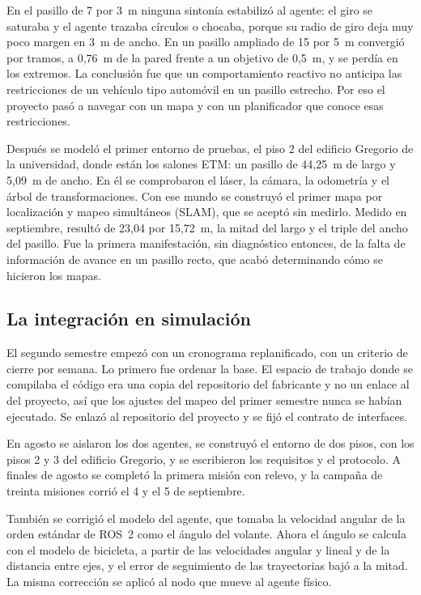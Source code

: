En el pasillo de 7 por 3~m ninguna sintonía estabilizó al agente: el giro se
saturaba y el agente trazaba círculos o chocaba, porque su radio de giro deja
muy poco margen en 3~m de ancho. En un pasillo ampliado de 15 por 5~m convergió
por tramos, a 0,76~m de la pared frente a un objetivo de 0,5~m, y se perdía
en los extremos. La conclusión fue que un comportamiento reactivo no anticipa las restricciones de un vehículo tipo automóvil en un pasillo estrecho.
Por eso el proyecto pasó a navegar con un mapa y con un planificador que conoce
esas restricciones.

Después se modeló el primer entorno de pruebas, el piso 2 del edificio Gregorio de la universidad, donde están los salones ETM: un pasillo de 44,25~m de largo y 5,09~m de ancho. En él se comprobaron el láser, la cámara, la odometría y el árbol de transformaciones. Con ese mundo se construyó el primer mapa por localización y
mapeo simultáneos (SLAM), que se aceptó sin medirlo. Medido en septiembre,
resultó de 23,04 por 15,72~m, la mitad del largo y el triple del ancho del
pasillo. Fue la primera manifestación, sin diagnóstico entonces, de la falta de información de avance en un pasillo recto, que acabó determinando cómo se hicieron los mapas.

\subsection{La integración en simulación}
\label{sec:recorrido-sim}

El segundo semestre empezó con un cronograma replanificado, con un criterio de cierre por semana. Lo primero fue ordenar la base.
El espacio de trabajo donde se compilaba el código era una copia del repositorio
del fabricante y no un enlace al del proyecto, así que los ajustes del mapeo del
primer semestre nunca se habían ejecutado. Se enlazó al repositorio del proyecto
y se fijó el contrato de interfaces.

En agosto se aislaron los dos agentes, se construyó el entorno de dos pisos, con los pisos 2 y 3 del edificio Gregorio, y se escribieron los requisitos y el protocolo. A finales de agosto se completó la primera misión con relevo, y la campaña de treinta misiones corrió el 4 y el 5 de septiembre.

También se corrigió el modelo del agente, que tomaba la velocidad angular de la
orden estándar de ROS~2 como el ángulo del volante. Ahora el ángulo se calcula con
el modelo de bicicleta, a partir de las velocidades angular y lineal y de la
distancia entre ejes, y el error de seguimiento de las trayectorias bajó a la
mitad. La misma corrección se aplicó al nodo que mueve al agente físico.

